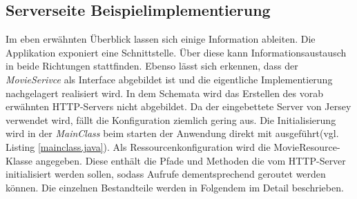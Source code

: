 \documentclass[fleqn,10.5pt,ngerman]{SelfArx}
\begin{document}
\subsection{Serverseite Beispielimplementierung}
Im eben erwähnten Überblick lassen sich einige Information ableiten. Die Applikation exponiert eine Schnittstelle. Über diese kann Informationsaustausch in beide Richtungen stattfinden. Ebenso lässt sich erkennen, dass der \textit{MovieSerivce} als Interface abgebildet ist und die eigentliche Implementierung nachgelagert realisiert wird. In dem Schemata wird das Erstellen des vorab erwähnten HTTP-Servers nicht abgebildet. Da der eingebettete Server von Jersey verwendet wird, fällt die Konfiguration ziemlich gering aus. Die Initialisierung wird in der \textit{MainClass} beim starten der Anwendung direkt mit ausgeführt(vgl. Listing \ref{mainclass.java}). Als Ressourcenkonfiguration wird die MovieResource-Klasse angegeben. Diese enthält die Pfade und Methoden die vom HTTP-Server initialisiert werden sollen, sodass Aufrufe dementsprechend geroutet werden können. Die einzelnen Bestandteile werden in Folgendem im Detail beschrieben.

\end{document}
